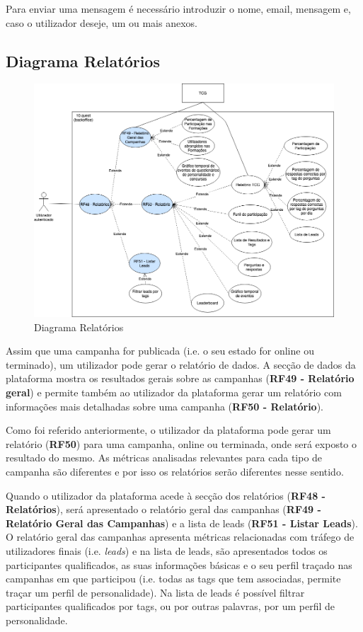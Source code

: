 Para enviar uma mensagem é necessário introduzir o nome, email, mensagem e, caso o utilizador deseje, um ou mais anexos.

\newpage

\subsection{Diagrama Relatórios}
\label{d:relatorios}

\begin{figure}[ht!]
	\begin{center}
		\includegraphics[width=1\textwidth]{img/rf/relatorio}
		\caption{Diagrama Relatórios}
		\label{fig:rf-relatorios}
	\end{center}
\end{figure}

Assim que uma campanha for publicada (i.e. o seu estado for online ou terminado), um utilizador pode gerar o relatório de dados. A secção de dados da plataforma mostra os resultados gerais sobre as campanhas (\textbf{RF49 - Relatório geral}) e permite também ao utilizador da plataforma gerar um relatório com informações mais detalhadas sobre uma campanha (\textbf{RF50 - Relatório}).

Como foi referido anteriormente, o utilizador da plataforma pode gerar um relatório (\textbf{RF50}) para uma campanha, online ou terminada, onde será exposto o resultado do mesmo. As métricas analisadas relevantes para cada tipo de campanha são diferentes e por isso os relatórios serão diferentes nesse sentido.

Quando o utilizador da plataforma acede à secção dos relatórios (\textbf{RF48 - Relatórios}), será apresentado o relatório geral das campanhas (\textbf{RF49 - Relatório Geral das Campanhas}) e a lista de leads (\textbf{RF51 - Listar Leads}). O relatório geral das campanhas apresenta métricas relacionadas com tráfego de utilizadores finais (i.e. \textit{leads}) e na lista de leads, são apresentados todos os participantes qualificados, as suas informações básicas e o seu perfil traçado nas campanhas em que participou (i.e. todas as tags que tem associadas, permite traçar um perfil de personalidade). Na lista de leads é possível filtrar participantes qualificados por tags, ou por outras palavras, por um perfil de personalidade.
	
